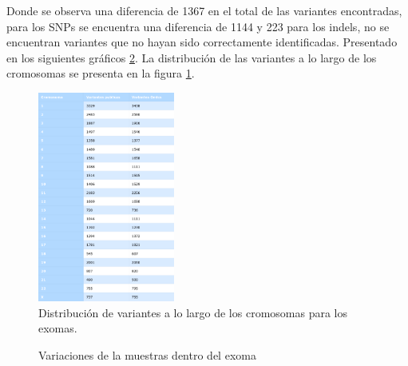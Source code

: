 Donde se observa una diferencia de 1367 en el total de las variantes encontradas, para los SNPs se encuentra una diferencia de 1144 y 223 para los indels, no se encuentran variantes que no hayan sido correctamente identificadas. Presentado en los siguientes gráficos \ref{f:histogramas2}. La distribución de las variantes a lo largo de los cromosomas se presenta en la  figura \ref{fig:tabla2}.\\

\begin{figure}[]
	\centering
	\includegraphics[width=0.4\textwidth]{Kap2/latex_table2}
	\caption{Distribución de variantes a lo largo de los cromosomas para los exomas.} \label{fig:tabla2}
\end{figure}

\begin{figure}[H]
	\centering
	\caption{Variaciones de la muestras dentro del exoma}
	\label{f:histogramas2}
\end{figure}


